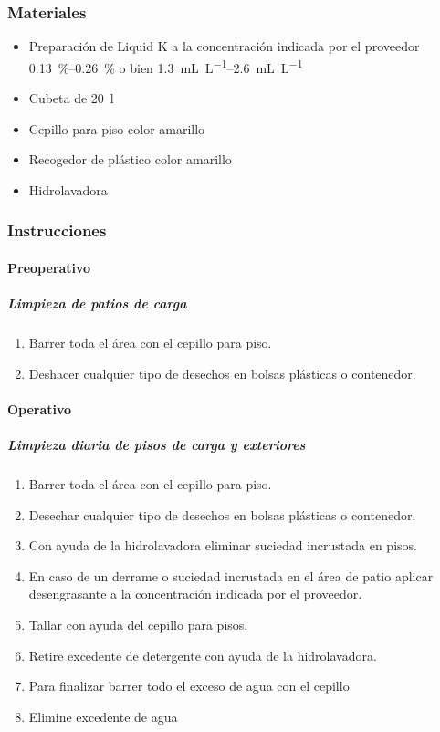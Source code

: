 \subsubsection{Materiales}

\begin{itemize}
	\item Preparación de Liquid K a la concentración indicada por el proveedor \qtyrange{0.13}{0.26}{\percent} o bien \qtyrange{1.3}{2.6}{\milli\liter\per\liter}
	\item Cubeta de \qty{20}{\litre}
	\item Cepillo para piso color amarillo
	\item Recogedor de plástico color amarillo
	\item Hidrolavadora
\end{itemize}

\subsubsection{Instrucciones}

\paragraph{Preoperativo}

\subparagraph{Limpieza de patios de carga}

\begin{enumerate}
	\item Barrer toda el área con el cepillo para piso.
	\item Deshacer cualquier tipo de desechos en bolsas plásticas o contenedor.
\end{enumerate}

\paragraph{Operativo}

\subparagraph{Limpieza diaria de pisos de carga y exteriores}

\begin{enumerate}
	\item Barrer toda el área con el cepillo para piso.
	\item Desechar cualquier tipo de desechos en bolsas plásticas o contenedor.
	\item Con ayuda de la hidrolavadora eliminar suciedad incrustada en pisos.
	\item En caso de un derrame o suciedad incrustada en el área de patio aplicar desengrasante a la concentración indicada por el proveedor.
	\item Tallar con ayuda del cepillo para pisos.
	\item Retire excedente de detergente con ayuda de la hidrolavadora.
	\item Para finalizar barrer todo el exceso de agua con el cepillo
	\item Elimine excedente de agua
\end{enumerate}

